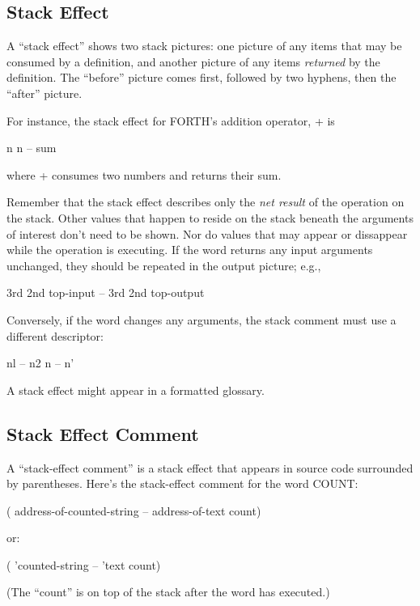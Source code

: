 \subsection{Stack Effect}

A ``stack effect'' shows two stack pictures: one picture of any items that
may be consumed by a definition, and another picture of any items
\emph{returned} by the definition.  The ``before'' picture comes first, followed by
two hyphens, then the ``after'' picture.

For instance, the stack effect for FORTH's addition operator, + is
\begin{Code}
n n -- sum
\end{Code}
where + consumes two numbers and returns their sum.

Remember that the stack effect describes only the \emph{net result} of the
operation on the stack.  Other values that happen to reside on the stack
beneath the arguments of interest don't need to be shown.  Nor do values
that may appear or dissappear while the operation is executing.
If the word returns any input arguments unchanged, they should be
repeated in the output picture; e.g.,
\begin{Code}
3rd 2nd top-input -- 3rd 2nd top-output
\end{Code}

Conversely, if the word changes any arguments, the stack comment must
use a different descriptor:
\begin{Code}
nl -- n2
n  -- n'
\end{Code}
A stack effect might appear in a formatted glossary.

\subsection{Stack Effect Comment}

A ``stack-effect comment'' is a stack effect that appears in source code
surrounded by parentheses.  Here's the stack-effect comment for the word
COUNT:
\begin{Code}
( address-of-counted-string -- address-of-text count)
\end{Code}
or:
\begin{Code}
( 'counted-string -- 'text count)
\end{Code}
(The ``count'' is on top of the stack after the word has executed.)

